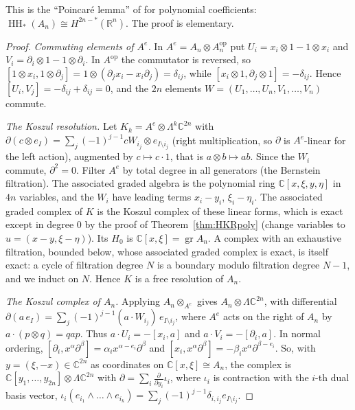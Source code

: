 \documentclass[11pt,oneside,reqno]{article}
\DeclareMathOperator{\HH}{HH}
\DeclareMathOperator{\gr}{gr}
\newcommand{\C}{\mathbb C}
\newcommand{\R}{\mathbb R}
\newcommand{\pa}{\partial}
\theoremstyle{plain}
\theoremstyle{definition}
\theoremstyle{remark}
\begin{document}
This is the ``Poincaré lemma'' of \cite[\S5]{BG} for polynomial
coefficients: \(\HH_*(A_n)\cong H^{2n-*}(\R^n)\). The proof is elementary.

\begin{proof}
\emph{Commuting elements of \(A^e\).} In \(A^e=A_n\otimes A_n^{\mathrm{op}}\)
put \(U_i=x_i\otimes1-1\otimes x_i\) and \(V_i=\pa_i\otimes1-1\otimes\pa_i\).
In \(A^{\mathrm{op}}\) the commutator is reversed, so \([1\otimes x_i,1\otimes\pa_j]
=1\otimes(\pa_jx_i-x_i\pa_j)=\delta_{ij}\), while \([x_i\otimes1,\pa_j\otimes1]=
-\delta_{ij}\). Hence \([U_i,V_j]=-\delta_{ij}+\delta_{ij}=0\), and the
\(2n\) elements \(W=(U_1,\dots,U_n,V_1,\dots,V_n)\) commute.

\emph{The Koszul resolution.} Let \(K_k=A^e\otimes\Lambda^k\C^{2n}\) with
\(\pa(c\otimes e_I)=\sum_j(-1)^{j-1}cW_{i_j}\otimes e_{I\setminus i_j}\) (right
multiplication, so \(\pa\) is \(A^e\)-linear for the left action), augmented by
\(c\mapsto c\cdot1\), that is \(a\otimes b\mapsto ab\). Since the \(W_i\)
commute, \(\pa^2=0\). Filter \(A^e\) by total degree in all generators (the
Bernstein filtration). The associated graded algebra is the polynomial ring
\(\C[x,\xi,y,\eta]\) in \(4n\) variables, and the \(W_i\) have leading terms
\(x_i-y_i\), \(\xi_i-\eta_i\). The associated graded complex of \(K\) is the
Koszul complex of these linear forms, which is exact except in degree
\(0\) by the proof of Theorem~\ref{thm:HKRpoly} (change variables to
\(u=(x-y,\xi-\eta)\)). Its \(H_0\) is \(\C[x,\xi]=\gr A_n\). A complex with an
exhaustive filtration, bounded below, whose associated graded complex is
exact, is itself exact: a cycle of filtration degree \(N\) is a boundary
modulo filtration degree \(N-1\), and we induct on \(N\). Hence \(K\) is a free
resolution of \(A_n\).

\emph{The Koszul complex of \(A_n\).} Applying \(A_n\otimes_{A^e}\) gives
\(A_n\otimes\Lambda\C^{2n}\), with differential
\(\pa(a\,e_I)=\sum_j(-1)^{j-1}(a\cdot W_{i_j})\,e_{I\setminus i_j}\), where
\(A^e\) acts on the right of \(A_n\) by \(a\cdot(p\otimes q)=qap\). Thus
\(a\cdot U_i=-[x_i,a]\) and \(a\cdot V_i=-[\pa_i,a]\). In normal ordering,
\([\pa_i,x^\alpha\pa^\beta]=\alpha_ix^{\alpha-e_i}\pa^\beta\) and
\([x_i,x^\alpha\pa^\beta]=-\beta_ix^\alpha\pa^{\beta-e_i}\). So, with
\(y=(\xi,-x)\in\C^{2n}\) as coordinates on \(\C[x,\xi]\cong A_n\), the complex
is \(\C[y_1,\dots,y_{2n}]\otimes\Lambda\C^{2n}\) with
\(\pa=\sum_i\frac{\pa}{\pa y_i}\iota_i\), where \(\iota_i\) is contraction with
the \(i\)-th dual basis vector, \(\iota_i(e_{i_1}\wedge\dots\wedge e_{i_k})=
\sum_j(-1)^{j-1}\delta_{i,i_j}e_{I\setminus i_j}\).


\end{proof}
\end{document}
